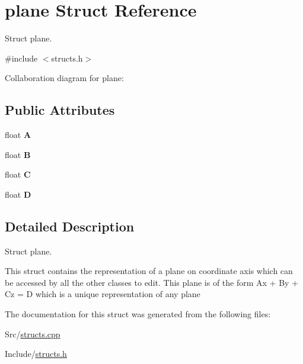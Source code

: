 \hypertarget{structplane}{}\section{plane Struct Reference}
\label{structplane}


Struct plane.  




{\ttfamily \#include $<$structs.\+h$>$}



Collaboration diagram for plane\+:
\subsection*{Public Attributes}
\begin{DoxyCompactItemize}
\item 
float {\bfseries A}\hypertarget{structplane_a7cbe59df743ed3cf5b914b94e5d8ae52}{}\label{structplane_a7cbe59df743ed3cf5b914b94e5d8ae52}

\item 
float {\bfseries B}\hypertarget{structplane_a03abeea8dacf60d86309aa336269906f}{}\label{structplane_a03abeea8dacf60d86309aa336269906f}

\item 
float {\bfseries C}\hypertarget{structplane_a88b564304a3acb0f68186e2ea71a0cdc}{}\label{structplane_a88b564304a3acb0f68186e2ea71a0cdc}

\item 
float {\bfseries D}\hypertarget{structplane_a3c9cd28e6ff7feccc4deee7678d9f8f9}{}\label{structplane_a3c9cd28e6ff7feccc4deee7678d9f8f9}

\end{DoxyCompactItemize}


\subsection{Detailed Description}
Struct plane. 

This struct contains the representation of a plane on coordinate axis which can be accessed by all the other classes to edit. This plane is of the form Ax + By + Cz = D which is a unique representation of any plane 

The documentation for this struct was generated from the following files\+:\begin{DoxyCompactItemize}
\item 
Src/\hyperlink{structs_8cpp}{structs.\+cpp}\item 
Include/\hyperlink{structs_8h}{structs.\+h}\end{DoxyCompactItemize}
